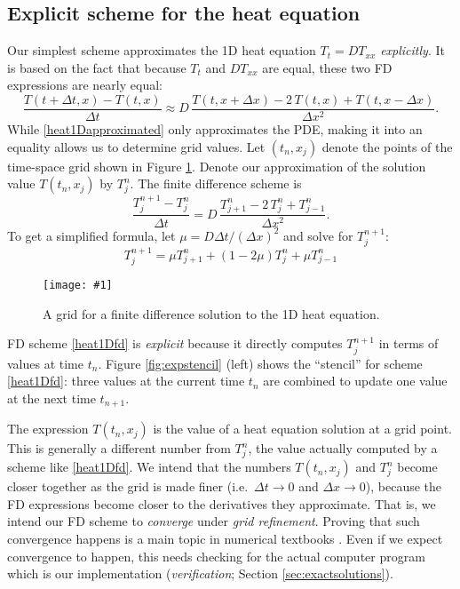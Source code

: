 \documentclass[letterpaper,final,12pt,reqno]{amsart}
\newcommand{\onefigsize}[3]{
\begin{figure}[ht]
\centering
\texttt{[image: \#1]}
\caption{#2}
\label{fig:#1}
\end{figure}}
\begin{document}
\subsection*{Explicit scheme for the heat equation}  Our simplest scheme approximates the 1D heat equation $T_t=D T_{xx}$ \emph{explicitly}.  It is based on the fact that because $T_t$ and $D T_{xx}$ are equal, these two FD expressions are nearly equal:
\begin{equation}
\frac{T(t+\Delta t,x) - T(t,x)}{\Delta t} \approx D\,\frac{T(t,x+\Delta x) - 2\, T(t,x) + T(t,x-\Delta x)}{\Delta x^2}.  \label{heat1Dapproximated}
\end{equation}
While \eqref{heat1Dapproximated} only approximates the PDE, making it into an equality allows us to determine grid values.  Let $(t_n,x_j)$ denote the points of the time-space grid shown in Figure \ref{fig:timespacegrid}.  Denote our approximation of the solution value $T(t_n,x_j)$ by $T_j^n$.  The finite difference scheme is
	$$\frac{T_j^{n+1} - T_j^n}{\Delta t} = D\,\frac{T_{j+1}^n - 2\, T_j^n + T_{j-1}^n}{\Delta x^2}.$$
To get a simplified formula, let $\mu = D \Delta t / (\Delta x)^2$ and solve for $T_j^{n+1}$:
\begin{equation}
  T_j^{n+1} = \mu T_{j+1}^n + (1 - 2 \mu) T_j^n + \mu T_{j-1}^n \label{heat1Dfd}
\end{equation}

\onefigsize{timespacegrid}{A grid for a finite difference solution to the 1D heat equation.}{2.0in}

FD scheme \eqref{heat1Dfd} is \emph{explicit} because it directly computes $T_j^{n+1}$ in terms of values at time $t_n$.  Figure \ref{fig:expstencil} (left) shows the ``stencil'' for scheme \eqref{heat1Dfd}: three values at the current time $t_n$ are combined to update one value at the next time $t_{n+1}$.

The expression $T(t_n,x_j)$ is the value of a heat equation solution at a grid point.  This is generally a different number from $T_j^n$, the value actually computed by a scheme like \eqref{heat1Dfd}.  We intend that the numbers $T(t_n,x_j)$ and $T_j^n$ become closer together as the grid is made finer (i.e.~$\Delta t \to 0$ and $\Delta x \to 0$), because the FD expressions become closer to the derivatives they approximate.  That is, we intend our FD scheme to \emph{converge} under \emph{grid refinement}.  Proving that such convergence happens is a main topic in numerical textbooks \cite{LeVequeFD,MortonMayers}.  Even if we expect convergence to happen, this needs checking for the actual computer program which is our implementation (\emph{verification}; Section \ref{sec:exactsolutions}).
\end{document}
